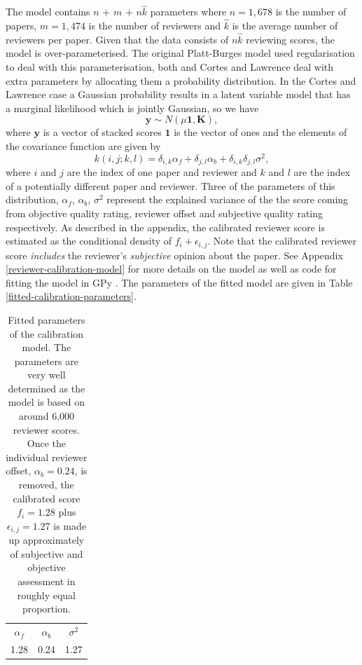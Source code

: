 \documentclass[twoside]{article}
\begin{document}
The model contains $n$ + $m$ + $n\hat{k}$ parameters where $n=1,678$
is the number of papers, $m=1,474$ is the number of reviewers and
$\hat{k}$ is the average number of reviewers per paper. Given that the
data consists of $n\hat{k}$ reviewing scores, the model is
over-parameterised. The original Platt-Burges model used
regularisation to deal with this parameterisation, both
\cite{Ge-bayesian15} and Cortes and Lawrence deal with extra
parameters by allocating them a probability distribution. In the
Cortes and Lawrence case a Gaussian probability results in a latent
variable model that has a marginal likelihood which is jointly
Gaussian, so we have
$$
\mathbf{y} \sim N(\mu \mathbf{1}, \mathbf{K}),
$$
where $\mathbf{y}$ is a vector of stacked scores $\mathbf{1}$ is
the vector of ones and the elements of the covariance function are given
by
$$
k(i,j; k,l) = \delta_{i,k} \alpha_f + \delta_{j,l} \alpha_b + \delta_{i, k}\delta_{j,l} \sigma^2,
$$ where $i$ and $j$ are the index of one paper and reviewer and $k$
and $l$ are the index of a potentially different paper and
reviewer. Three of the parameters of this distribution, $\alpha_f$,
$\alpha_b$, $\sigma^2$ represent the explained variance of the the
score coming from objective quality rating, reviewer offset and
subjective quality rating respectively. As described in the appendix,
the calibrated reviewer score is estimated as the conditional density
of $f_i + \epsilon_{i,j}$. Note that the calibrated reviewer score
\emph{includes} the reviewer's \emph{subjective} opinion about the
paper. See Appendix \ref{reviewer-calibration-model} for more details
on the model as well as code for fitting the model in GPy
\cite{Gpy-20012}. The parameters of the fitted model are given in
Table \ref{fitted-calibration-parameters}.

\begin{table}[htb]
  \label{table-fitted-calibration-parameters}
  \caption{Fitted parameters of the calibration model. The parameters are very well determined as the model is based on around 6,000 reviewer scores. Once the individual reviewer offset, $\alpha_b=0.24$, is removed, the calibrated score $f_i = 1.28$ plus $\epsilon_{i,j}=1.27$ is made up approximately of subjective and objective assessment in roughly equal proportion.} 
  \begin{center}
  \begin{tabular}{ccc}
    $\alpha_f$ & $\alpha _b$ & $\sigma^2$ \\
    1.28 & 0.24 & 1.27
  \end{tabular}
  \end{center}
\end{table}  
\end{document}
